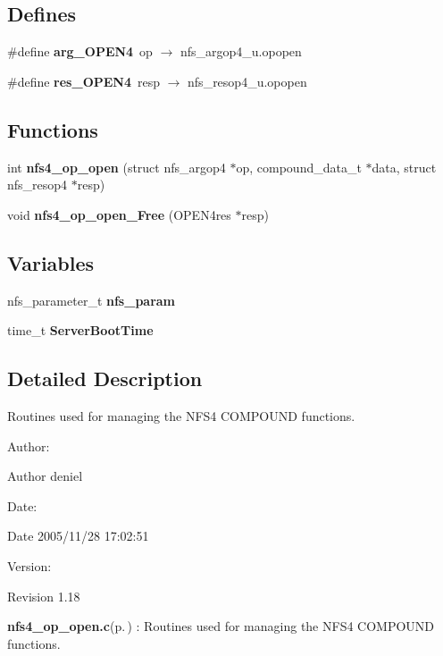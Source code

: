 \subsection*{Defines}
\begin{CompactItemize}
\item 
\#define {\bf arg\_\-OPEN4}\ op $\rightarrow$ nfs\_\-argop4\_\-u.opopen
\item 
\#define {\bf res\_\-OPEN4}\ resp $\rightarrow$ nfs\_\-resop4\_\-u.opopen
\end{CompactItemize}
\subsection*{Functions}
\begin{CompactItemize}
\item 
int {\bf nfs4\_\-op\_\-open} (struct nfs\_\-argop4 $\ast$op, compound\_\-data\_\-t $\ast$data, struct nfs\_\-resop4 $\ast$resp)
\item 
void {\bf nfs4\_\-op\_\-open\_\-Free} (OPEN4res $\ast$resp)
\end{CompactItemize}
\subsection*{Variables}
\begin{CompactItemize}
\item 
nfs\_\-parameter\_\-t {\bf nfs\_\-param}
\item 
time\_\-t {\bf Server\-Boot\-Time}
\end{CompactItemize}


\subsection{Detailed Description}
Routines used for managing the NFS4 COMPOUND functions. 

\begin{Desc}
\item[Author:]\begin{Desc}
\item[Author]deniel \end{Desc}
\end{Desc}
\begin{Desc}
\item[Date:]\begin{Desc}
\item[Date]2005/11/28 17:02:51 \end{Desc}
\end{Desc}
\begin{Desc}
\item[Version:]\begin{Desc}
\item[Revision]1.18 \end{Desc}
\end{Desc}
{\bf nfs4\_\-op\_\-open.c}{\rm (p.\,\pageref{nfs4__op__open_8c})} : Routines used for managing the NFS4 COMPOUND functions.


